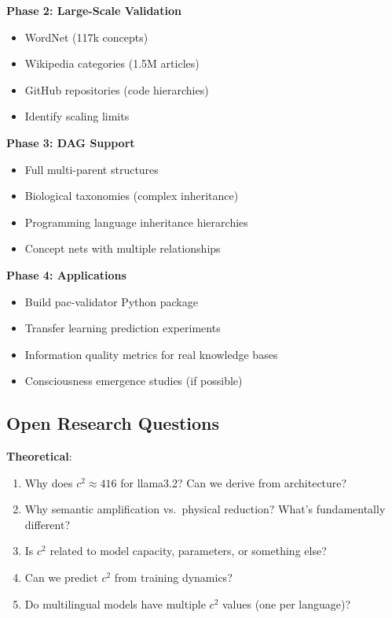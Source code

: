 \documentclass[11pt,a4paper]{article}
\begin{document}
\textbf{Phase 2: Large-Scale Validation}
\begin{itemize}
    \item WordNet (117k concepts)
    \item Wikipedia categories (1.5M articles)
    \item GitHub repositories (code hierarchies)
    \item Identify scaling limits
\end{itemize}

\textbf{Phase 3: DAG Support}
\begin{itemize}
    \item Full multi-parent structures
    \item Biological taxonomies (complex inheritance)
    \item Programming language inheritance hierarchies
    \item Concept nets with multiple relationships
\end{itemize}

\textbf{Phase 4: Applications}
\begin{itemize}
    \item Build pac-validator Python package
    \item Transfer learning prediction experiments
    \item Information quality metrics for real knowledge bases
    \item Consciousness emergence studies (if possible)
\end{itemize}

\subsection{Open Research Questions}

\textbf{Theoretical}:
\begin{enumerate}
    \item Why does $c^2 \approx 416$ for llama3.2? Can we derive from architecture?
    \item Why semantic amplification vs.\ physical reduction? What's fundamentally different?
    \item Is $c^2$ related to model capacity, parameters, or something else?
    \item Can we predict $c^2$ from training dynamics?
    \item Do multilingual models have multiple $c^2$ values (one per language)?
\end{enumerate}
\end{document}
